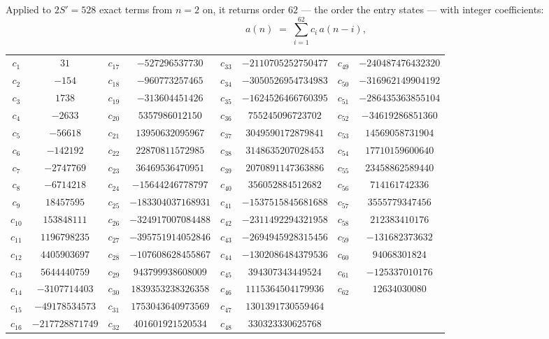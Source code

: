\documentclass[11pt,a4paper]{article}
\theoremstyle{plain}
\theoremstyle{definition}
\begin{document}
Applied to $2S'=528$ exact terms from $n=2$ on, it returns order $62$ --- the
order the entry states --- with integer coefficients:
\[
a(n)\;=\;\sum_{i=1}^{62}c_i\,a(n-i),
\]
\begin{center}\small
\begin{tabular}{cccccccc}
$c_{1}$ & $31$ & $c_{17}$ & $-527296537730$ & $c_{33}$ & $-2110705252750477$ & $c_{49}$ & $-240487476432320$ \\
$c_{2}$ & $-154$ & $c_{18}$ & $-960773257465$ & $c_{34}$ & $-3050526954734983$ & $c_{50}$ & $-316962149904192$ \\
$c_{3}$ & $1738$ & $c_{19}$ & $-313604451426$ & $c_{35}$ & $-1624526466760395$ & $c_{51}$ & $-286435363855104$ \\
$c_{4}$ & $-2633$ & $c_{20}$ & $5357986012150$ & $c_{36}$ & $755245096723702$ & $c_{52}$ & $-34619286851360$ \\
$c_{5}$ & $-56618$ & $c_{21}$ & $13950632095967$ & $c_{37}$ & $3049590172879841$ & $c_{53}$ & $14569058731904$ \\
$c_{6}$ & $-142192$ & $c_{22}$ & $22870811572985$ & $c_{38}$ & $3148635207028453$ & $c_{54}$ & $17710159600640$ \\
$c_{7}$ & $-2747769$ & $c_{23}$ & $36469536470951$ & $c_{39}$ & $2070891147363886$ & $c_{55}$ & $23458862589440$ \\
$c_{8}$ & $-6714218$ & $c_{24}$ & $-15644246778797$ & $c_{40}$ & $356052884512682$ & $c_{56}$ & $714161742336$ \\
$c_{9}$ & $18457595$ & $c_{25}$ & $-183304037168931$ & $c_{41}$ & $-1537515845681688$ & $c_{57}$ & $3555779347456$ \\
$c_{10}$ & $153848111$ & $c_{26}$ & $-324917007084488$ & $c_{42}$ & $-2311492294321958$ & $c_{58}$ & $212383410176$ \\
$c_{11}$ & $1196798235$ & $c_{27}$ & $-395751914052846$ & $c_{43}$ & $-2694945928315456$ & $c_{59}$ & $-131682373632$ \\
$c_{12}$ & $4405903697$ & $c_{28}$ & $-107608628455867$ & $c_{44}$ & $-1302086484379536$ & $c_{60}$ & $94068301824$ \\
$c_{13}$ & $5644440759$ & $c_{29}$ & $943799938608009$ & $c_{45}$ & $394307343449524$ & $c_{61}$ & $-125337010176$ \\
$c_{14}$ & $-3107714403$ & $c_{30}$ & $1839353238326358$ & $c_{46}$ & $1115364504179936$ & $c_{62}$ & $12634030080$ \\
$c_{15}$ & $-49178534573$ & $c_{31}$ & $1753043640973569$ & $c_{47}$ & $1301391730559464$ &  &  \\
$c_{16}$ & $-217728871749$ & $c_{32}$ & $401601921520534$ & $c_{48}$ & $330323330625768$ &  &  \\
\end{tabular}
\end{center}
\end{document}

